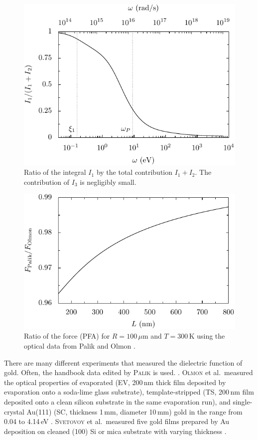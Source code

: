 \documentclass[twocolumn,superscriptaddress,pre]{revtex4-1}
\begin{document}
\begin{figure}
\includegraphics[width=0.7\columnwidth]{img/ratio.pdf}
\caption{Ratio of the integral $I_1$ by the total contribution $I_1+I_2$. The contribution of $I_3$ is negligibly small.}
\label{fig:ratio}
\end{figure}

\begin{figure}
\includegraphics[width=0.7\columnwidth]{img/diff.pdf}
\caption{Ratio of the force (PFA) for $R=100\,\mu$m and $T=300\,$K using the optical data from Palik \cite{Palik1995} and Olmon \cite{Olmon2012}.}
\label{fig:diff}
\end{figure}

There are many different experiments that measured the dielectric function of
gold. Often, the handbook data edited by \textsc{Palik} is used.
\cite{Palik1995}. \textsc{Olmon} et al.\ measured the optical properties of
evaporated (EV, 200\,nm thick film deposited by evaporation onto a soda-lime
glass substrate), template-stripped (TS, 200\,nm film deposited onto a clean
silicon substrate in the same evaporation run), and single-crystal Au(111) (SC,
thickness 1\,mm, diameter 10\,mm) gold in the range from 0.04 to 4.14\,eV
\cite{Olmon2012}. \textsc{Svetovoy} et al.\ measured five gold films prepared
by Au deposition on cleaned (100) Si or mica substrate with varying thickness
\cite{Svetovoy2008}.
\end{document}
